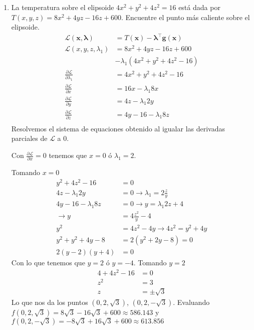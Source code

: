 \documentclass{article}
\begin{document}
\begin{multicols}{2}
\begin{enumerate}%
  \item La temperatura sobre el elipsoide $4x^2 + y^2 + 4z^2 = 16$ está dada por $T(x, y, z) =8x^2 + 4yz - 16z + 600$. Encuentre el punto más caliente sobre el elipsoide.
  \begin{align*}
  \mathcal{L}(\boldsymbol{x}, \boldsymbol{\lambda}) &= T(\boldsymbol{x}) - \boldsymbol{\lambda}^\intercal \boldsymbol{g}(\boldsymbol{x})\\
  \mathcal{L}(x, y, z, \lambda_1) &= 8x^2 + 4yz - 16z + 600 \\&- \lambda_1(4x^2 + y^2 + 4z^2 - 16)\\
  \frac{\partial\mathcal{L}}{\partial \lambda_1} &= 4x^2 + y^2 + 4z^2 - 16\\
  \frac{\partial\mathcal{L}}{\partial x} &= 16x - \lambda_1 8x     \\
  \frac{\partial\mathcal{L}}{\partial y} &= 4z - \lambda_1 2y      \\
  \frac{\partial\mathcal{L}}{\partial z} &= 4y - 16 - \lambda_1 8z \\
  \end{align*}
  Resolvemos el sistema de equaciones obtenido al igualar las derivadas parciales de $\mathcal{L}$ a $0$.

  Con $\frac{\partial\mathcal{L}}{\partial x} = 0$ tenemos que $x = 0$ ó $\lambda_1 = 2$.

  Tomando $ x = 0 $
  \begin{align*}
  y^2 + 4z^2 - 16&= 0\\
  4z - \lambda_1 2y &= 0 \rightarrow \lambda_1 = 2\frac{z}{y}\\
  4y - 16 - \lambda_1 8z &=0 \rightarrow y = \lambda_1 2z + 4\\
  \rightarrow y &= 4\frac{z^2}{y} - 4\\
  y^2 &= 4z^2 - 4y \rightarrow 4z^2 = y^2 + 4y\\
  y^2 + y^2 + 4y -8&= 2(y^2 + 2y -8) = 0\\
  2(y-2)(y+4) &= 0
  \end{align*}
  Con lo que tenemos que $y = 2$ ó $y = -4$. Tomando $y = 2$
  \begin{align*}
  4 + 4z^2 - 16 &= 0\\
  z^2 &= 3\\
  z &= \pm \sqrt{3}
  \end{align*}
  Lo que nos da los puntos $(0, 2, \sqrt{3})$, $(0, 2, -\sqrt{3})$. Evaluando $f(0, 2, \sqrt{3}) = 8\sqrt{3} - 16\sqrt{3} + 600 \approx 586.143$ y  $f(0, 2, -\sqrt{3}) = -8\sqrt{3} + 16\sqrt{3} + 600 \approx 613.856$


\end{enumerate}
\end{multicols}
\end{document}
